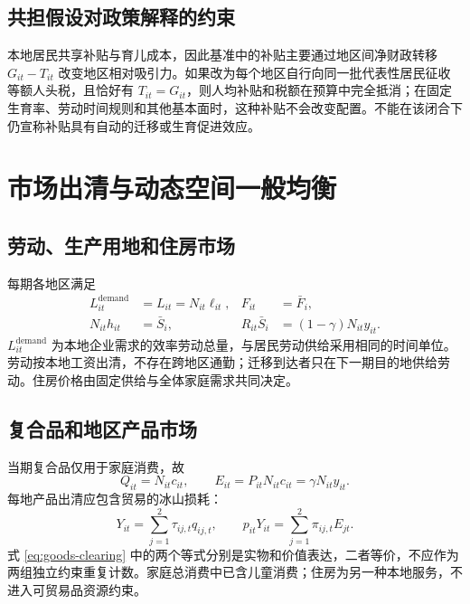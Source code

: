 \documentclass[UTF8,a4paper,zihao=-4,fontset=windows]{ctexart}
\numberwithin{equation}{section}
\begin{document}
\subsection{共担假设对政策解释的约束}
本地居民共享补贴与育儿成本，因此基准中的补贴主要通过地区间净财政转移 $G_{it}-T_{it}$ 改变地区相对吸引力。如果改为每个地区自行向同一批代表性居民征收等额人头税，且恰好有 $T_{it}=G_{it}$，则人均补贴和税额在预算中完全抵消；在固定生育率、劳动时间规则和其他基本面时，这种补贴不会改变配置。不能在该闭合下仍宣称补贴具有自动的迁移或生育促进效应。

\section{市场出清与动态空间一般均衡}
\label{sec:equilibrium}

\subsection{劳动、生产用地和住房市场}
每期各地区满足
\begin{align}
  L^{\mathrm{demand}}_{it}&=L_{it}=N_{it}\ell_{it},
    & F_{it}&=\bar F_i,\label{eq:factor-clearing}\\
  N_{it}h_{it}&=\bar S_i,
    & R_{it}\bar S_i&=(1-\gamma)N_{it}y_{it}.
    \label{eq:housing-clearing}
\end{align}
$L^{\mathrm{demand}}_{it}$ 为本地企业需求的效率劳动总量，与居民劳动供给采用相同的时间单位。劳动按本地工资出清，不存在跨地区通勤；迁移到达者只在下一期目的地供给劳动。住房价格由固定供给与全体家庭需求共同决定。

\subsection{复合品和地区产品市场}
当期复合品仅用于家庭消费，故
\begin{equation}
  Q_{it}=N_{it}c_{it},\qquad
  E_{it}=P_{it}N_{it}c_{it}=\gamma N_{it}y_{it}.
  \label{eq:composite-clearing}
\end{equation}
每地产品出清应包含贸易的冰山损耗：
\begin{equation}
  Y_{it}=\sum_{j=1}^2\tau_{ij,t}q_{ij,t},\qquad
  p_{it}Y_{it}=\sum_{j=1}^2\pi_{ij,t}E_{jt}.
  \label{eq:goods-clearing}
\end{equation}
式 \eqref{eq:goods-clearing} 中的两个等式分别是实物和价值表达，二者等价，不应作为两组独立约束重复计数。家庭总消费中已含儿童消费；住房为另一种本地服务，不进入可贸易品资源约束。
\end{document}
